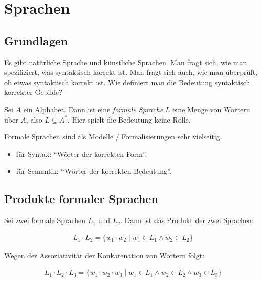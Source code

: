 \documentclass[12pt,a4paper,oneside]{article}
\newcommand{\afz}[1]{\enquote{#1}}
\newcommand{\emptyline}{\hspace*{\fill}}
\begin{document}
    \section{Sprachen}

        \subsection{Grundlagen}

            Es gibt natürliche Sprache und künstliche Sprachen.
            Man fragt sich, wie man spezifiziert, was syntaktisch korrekt ist.
            Man fragt sich auch, wie man überprüft, ob etwas syntaktisch korrekt ist.
            Wie definiert man die Bedeutung syntaktisch korrekter Gebilde?

            \emptyline

            Sei $A$ ein Alphabet.
            Dann ist eine \textit{formale Sprache} $L$ eine Menge von Wörtern über $A$, also $L \subseteq A^*$.
            Hier spielt die Bedeutung keine Rolle.

            \emptyline

            Formale Sprachen sind als Modelle / Formalisierungen sehr vielseitig.
            
            \begin{itemize}
                \item für Syntax: \afz{Wörter der korrekten Form}.
                \item für Semantik: \afz{Wörter der korrekten Bedeutung}.
            \end{itemize}

        \subsection{Produkte formaler Sprachen}

            Sei zwei formale Sprachen $L_1$ und $L_2$.
            Dann ist das Produkt der zwei Sprachen:

            \vspace{-1em}
            \begin{align*}
                L_1 \cdot L_2 = \{w_1 \cdot w_2 \;|\; w_1 \in L_1 \wedge w_2 \in L_2\}
            \end{align*}

            Wegen der Assoziativität der Konkatenation von Wörtern folgt:

            \vspace{-1em}
            \begin{align*}
                L_1 \cdot L_2 \cdot L_3 = \{w_1 \cdot w_2 \cdot w_3 \;|\; w_1 \in L_1 \wedge w_2 \in L_2 \wedge w_3 \in L_3\}
            \end{align*}
\end{document}
